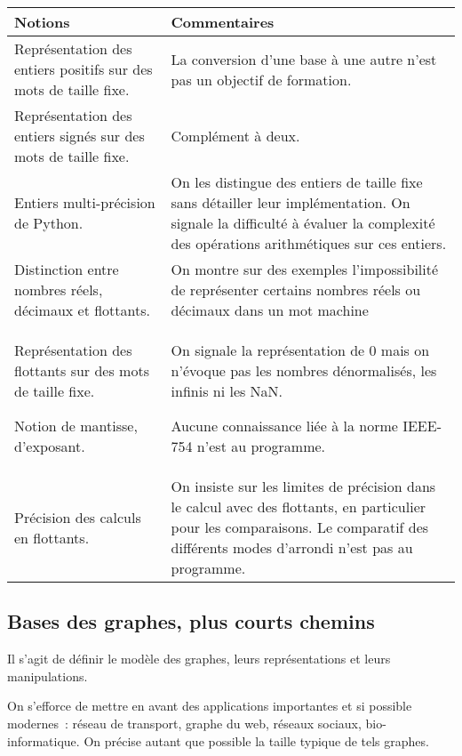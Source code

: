 \begin{longtable}{|p{\lnotion}|p{\comment}|}
    \hline
    \textbf{Notions} & \textbf{Commentaires} \\
    \hline \hline
	Représentation des entiers positifs sur des mots de taille fixe.&
	La conversion d'une base à une autre n'est pas un objectif de formation. \\ \hline
	Représentation des entiers signés sur des mots de taille fixe.&
	Complément à deux. \\ \hline
	Entiers multi-précision de Python.&
	On les distingue des entiers de taille fixe sans détailler leur implémentation. On signale la difficulté à évaluer la complexité des opérations arithmétiques sur ces entiers. \\ \hline
	Distinction entre nombres réels, décimaux et flottants.&
	On montre sur des exemples l'impossibilité de représenter certains nombres
	réels ou décimaux dans un mot machine \\ \hline

	Représentation des flottants sur des mots de taille fixe.

	Notion de mantisse, d'exposant.&
	On signale la représentation de 0 mais on n'évoque pas les nombres dénormalisés, les infinis ni les NaN.

	Aucune connaissance liée à la norme IEEE-754 n'est au programme. \\ \hline
	Précision des calculs en flottants.&
	On insiste sur les limites de précision dans le calcul avec des flottants, en particulier pour les comparaisons. Le comparatif des différents modes d'arrondi n'est pas au programme.\\ \hline
\end{longtable}

\subsection{Bases des graphes, plus courts chemins}

Il s'agit de définir le modèle des graphes, leurs représentations et leurs manipulations.

On s'efforce de mettre en avant des applications importantes et si possible modernes~: réseau de transport, graphe du web, réseaux sociaux, bio-informatique. On précise autant que possible la taille typique de tels graphes.

